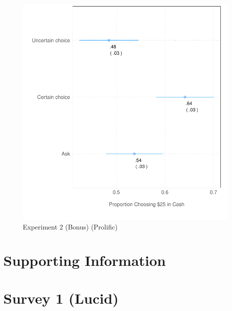 \documentclass[12pt, letterpaper]{article}
\begin{document}
\begin{figure}[h]
    \centering
    \includegraphics{figs/prolific_exp2.pdf}
    \caption{Experiment 2 (Bonus) (Prolific)}
    \label{fig:exp_2_prolific}
\end{figure}
\clearpage


\clearpage

\appendix
\renewcommand{\thesection}{SI \arabic{section}}
\renewcommand\thetable{\thesection.\arabic{table}}  
\renewcommand\thefigure{\thesection.\arabic{figure}}

\section*{Supporting Information}\label{si}

\section{Survey 1 (Lucid)}
\end{document}
